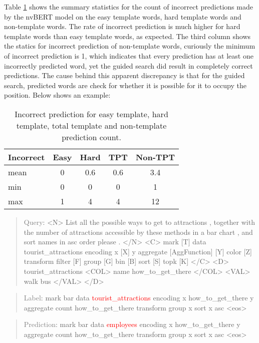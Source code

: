 \documentclass[
	a4paper, %
	10pt, %
	unnumberedsections, %
	twoside, %
]{t0003}
\newcommand{\gray}[1]{\textcolor{gray}{#1}}
\newcommand{\red}[1]{\textcolor{red}{#1}}
\begin{document}
Table \ref{tab:incorrectcount} shows the summary statistics for the count of incorrect predictions made by the nvBERT model on the easy template words, hard template words and non-template words. The rate of incorrect prediction is much higher for hard template words than easy template words, as expected. The third column shows the statics for incorrect prediction of non-template words, curiously the minimum of incorrect prediction is 1, which indicates that every prediction has at least one incorrectly predicted word, yet the guided search did result in completely correct predictions. The cause behind this apparent discrepancy is that for the guided search, predicted words are check for whether it is possible for it to occupy the position. Below shows an example:

\begin{table}
	\caption{Incorrect prediction for easy template, hard template, total template and non-template prediction count.}
	\centering
	\begin{tabular}{lcccc}
		\toprule
		Incorrect & Easy & Hard & TPT & Non-TPT  \\
		\midrule
		mean & 0 & 0.6 & 0.6 & 3.4 \\
                  min & 0 & 0 & 0 & 1 \\
                  max & 1 & 4 & 4 & 12 \\
		\bottomrule
	\end{tabular}
	\label{tab:incorrectcount}
\end{table}

\begin{quote}
\gray{Query}: <N> List all the possible ways to get to attractions , together with the number of attractions accessible by these methods in a bar chart , and sort names in asc order please . </N> <C> mark [T] data tourist\_attractions encoding x [X] y aggregate [AggFunction] [Y] color [Z] transform filter [F] group [G] bin [B] sort [S] topk [K] </C> <D> tourist\_attractions <COL> name how\_to\_get\_there </COL> <VAL> walk bus </VAL> </D>
\end{quote}

\begin{quote}
\gray{Label}: mark bar data \red{tourist\_attractions} encoding x how\_to\_get\_there y aggregate count how\_to\_get\_there transform group x sort x asc <eos>
\end{quote}

\begin{quote}
\gray{Prediction}: mark bar data \red{employees} encoding x how\_to\_get\_there y aggregate count how\_to\_get\_there transform group x sort x asc <eos>
\end{quote}
\end{document}
